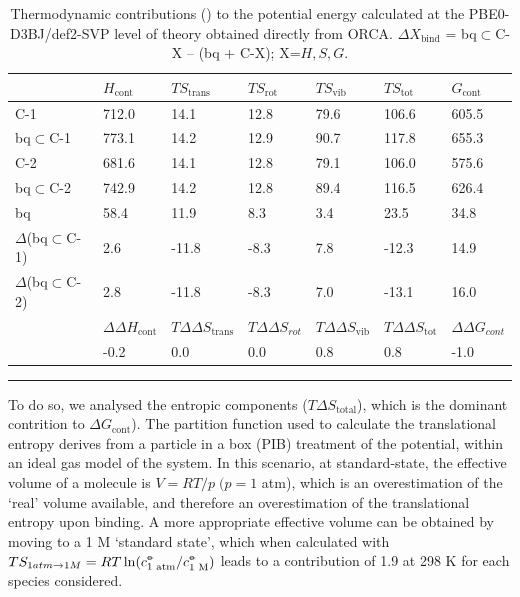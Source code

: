 \documentclass[../../main.tex]{subfiles}
\begin{document}
\begin{table}[h]
	\def\arraystretch{1.7}
	\begin{tabularx}{\textwidth}{YYYYYYY}
		\hline
		&$H_\text{cont}$&	$TS_\text{trans}$	&$TS_\text{rot}	$&$TS_\text{vib}$&	$TS_\text{tot}$&$G_\text{cont}$ 
\\
		\hline
		
		C-1	&712.0	&14.1&	12.8&	79.6&	106.6&	605.5
\\
		bq$\subset$C-1	&773.1&	14.2&	12.9&	90.7	&117.8&	655.3
\\
		C-2	&681.6	&14.1	&12.8&	79.1&	106.0&	575.6
\\
		bq$\subset$C-2	&742.9&	14.2&	12.8&	89.4&	116.5&	626.4
\\
		bq&	58.4&	11.9&	8.3	&3.4&	23.5	&34.8
\\
		$\Delta$(bq$\subset$C-1)&	2.6	&-11.8&	-8.3&	7.8&	-12.3&	14.9
\\
		$\Delta$(bq$\subset$C-2)&	2.8	&-11.8&	-8.3&	7.0	&-13.1&	16.0
\\
		&$\Delta\Delta H_\text{cont}$&	$T\Delta\Delta S_\text{trans}$	&$T\Delta\Delta S_{rot}$&	$T\Delta\Delta S_\text{vib}$&	$T\Delta\Delta S_\text{tot}$&	$\Delta\Delta G_{cont}$ 
\\
     	&	-0.2&	0.0	&0.0&	0.8	&0.8 &	-1.0
\\
		
	\end{tabularx}
	\hrule
	\vspace{0.2cm}
	\caption{Thermodynamic contributions (\kcal) to the potential energy calculated at the PBE0-D3BJ/def2-SVP level of theory obtained directly from ORCA. $\Delta X_\text{bind}$ = bq$\subset$C-X – (bq + C-X); X=$H, S, G$.}
	\label{table::si_da_5}
\end{table}


To do so, we analysed the entropic components ($T\Delta S_\text{total}$), which is the dominant contrition to $\Delta G_\text{cont}$). The partition function used to calculate the translational entropy derives from a particle in a box (PIB) treatment of the potential, within an ideal gas model of the system. In this scenario, at standard-state, the effective volume of a molecule is $V = RT/p \; (p = 1$ atm), which is an overestimation of the ‘real’ volume available, and therefore an overestimation of the translational entropy upon binding. A more appropriate effective volume can be obtained by moving to a 1 M ‘standard state’,\cite{Ribeiro2011} which when calculated with $TS_{1 atm \rightarrow 1 M} = RT \ln(c^{\circ\kern-0.495em-}_\text{1 atm} / c^{\circ\kern-0.495em-}_\text{1 M})$ leads to a contribution of 1.9 \kcalx at 298 K for each species considered.
\end{document}
